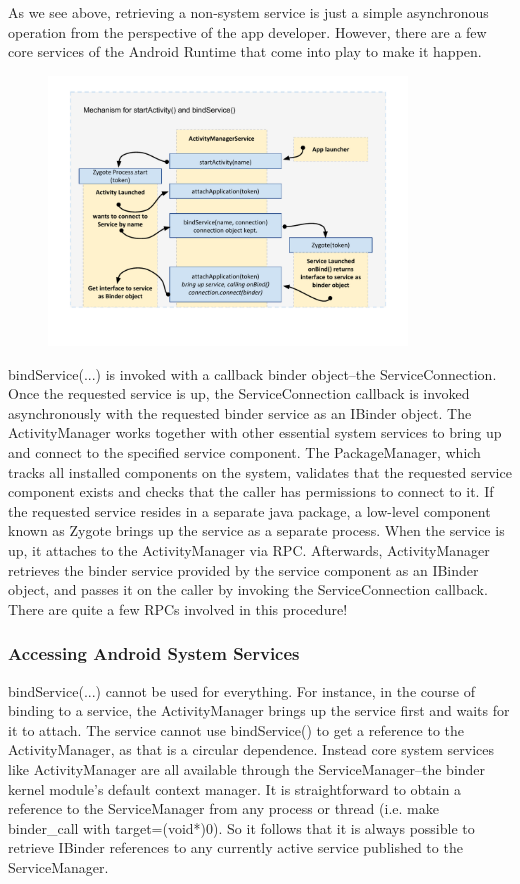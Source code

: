 \documentclass[prodmode]{acmlarge}
\begin{document}
As we see above, retrieving a non-system service is just a simple asynchronous operation from the perspective of the app developer. However, there are a few core services of the Android Runtime that come into play to make it happen.
\begin{figure}[h]
\centering
\includegraphics[width=0.85\textwidth]{drawings/bindService.pdf}
\end{figure}

bindService(...) is invoked with a callback binder object--the ServiceConnection. Once the requested service is up, the ServiceConnection callback is invoked asynchronously with the requested binder service as an IBinder object. The ActivityManager works together with other essential system services to bring up and connect to the specified service component. The PackageManager, which tracks all installed components on the system, validates that the requested service component exists and checks that the caller has permissions to connect to it. If the requested service resides in a separate java package, a low-level component known as Zygote brings up the service as a separate process. When the service is up, it attaches to the ActivityManager via RPC. Afterwards, ActivityManager retrieves the binder service provided by the service component as an IBinder object, and passes it on the caller by invoking the ServiceConnection callback. There are quite a few RPCs involved in this procedure!

\subsubsection{Accessing Android System Services}
bindService(...) cannot be used for everything. For instance, in the course of binding to a service, the ActivityManager brings up the service first and waits for it to attach. The service cannot use bindService() to get a reference to the ActivityManager, as that is a circular dependence. Instead core system services like ActivityManager are all available through the ServiceManager--the binder kernel module's default context manager. It is straightforward to obtain a reference to the ServiceManager from any process or thread (i.e. make binder\_call with target=(void*)0). So it follows that it is always possible to retrieve IBinder references to any currently active service published to the ServiceManager.
\end{document}
